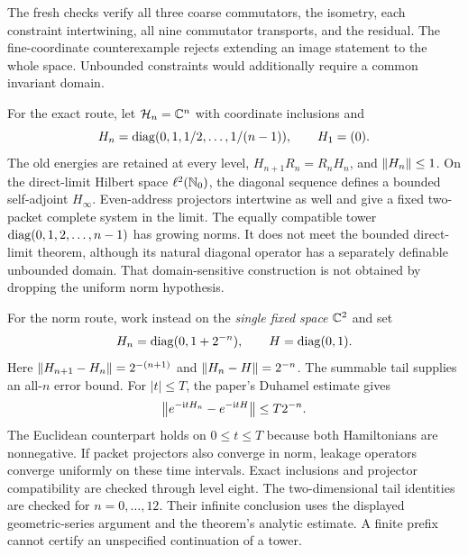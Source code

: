The fresh checks verify all three coarse commutators, the isometry, each constraint intertwining, all nine commutator transports, and the residual. The fine-coordinate counterexample rejects extending an image statement to the whole space. Unbounded constraints would additionally require a common invariant domain.

For the exact route, let $\mathcal H_n=\mathbb C^n$ with coordinate inclusions and
\[
H_n=\operatorname{diag}(0,1,1/2,\ldots,1/(n-1)),\qquad H_1=(0).
\]
The old energies are retained at every level, $H_{n+1}R_n=R_nH_n$, and $\left\lVert H_n\right\rVert\leq1$. On the direct-limit Hilbert space $\ell^2(\mathbb N_0)$, the diagonal sequence defines a bounded self-adjoint $H_\infty$. Even-address projectors intertwine as well and give a fixed two-packet complete system in the limit.
The equally compatible tower $\operatorname{diag}(0,1,2,\ldots,n-1)$ has growing norms. It does not meet the bounded direct-limit theorem, although its natural diagonal operator has a separately definable unbounded domain. That domain-sensitive construction is not obtained by dropping the uniform norm hypothesis.

For the norm route, work instead on the \emph{single fixed space} $\mathbb C^2$ and set
\[
H_n=\operatorname{diag}(0,1+2^{-n}),\qquad H=\operatorname{diag}(0,1).
\]
Here $\left\lVert H_{n+1}-H_n\right\rVert=2^{-(n+1)}$ and $\left\lVert H_n-H\right\rVert=2^{-n}$. The summable tail supplies an all-$n$ error bound. For $|t|\leq T$, the paper's Duhamel estimate gives
\[
\left\lVert e^{-\mathrm i tH_n}-e^{-\mathrm i tH}\right\rVert\leq T2^{-n}.
\]
The Euclidean counterpart holds on $0\leq t\leq T$ because both Hamiltonians are nonnegative. If packet projectors also converge in norm, leakage operators converge uniformly on these time intervals.
Exact inclusions and projector compatibility are checked through level eight. The two-dimensional tail identities are checked for $n=0,\ldots,12$. Their infinite conclusion uses the displayed geometric-series argument and the theorem's analytic estimate. A finite prefix cannot certify an unspecified continuation of a tower.

